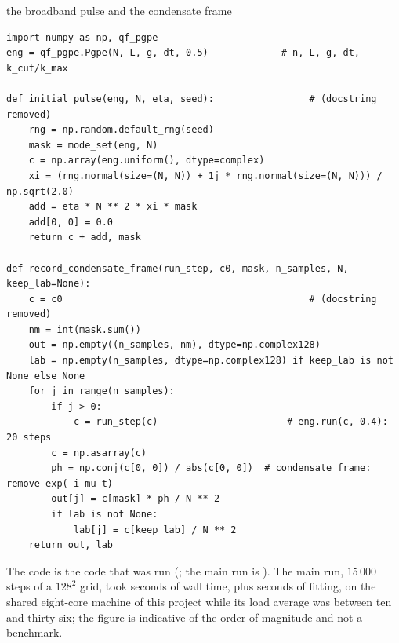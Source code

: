 \begin{rustbox}{the broadband pulse and the condensate frame}
\begin{lstlisting}[style=py,basicstyle=\ttfamily\footnotesize]
import numpy as np, qf_pgpe
eng = qf_pgpe.Pgpe(N, L, g, dt, 0.5)             # n, L, g, dt, k_cut/k_max

def initial_pulse(eng, N, eta, seed):                 # (docstring removed)
    rng = np.random.default_rng(seed)
    mask = mode_set(eng, N)
    c = np.array(eng.uniform(), dtype=complex)
    xi = (rng.normal(size=(N, N)) + 1j * rng.normal(size=(N, N))) / np.sqrt(2.0)
    add = eta * N ** 2 * xi * mask
    add[0, 0] = 0.0
    return c + add, mask

def record_condensate_frame(run_step, c0, mask, n_samples, N, keep_lab=None):
    c = c0                                            # (docstring removed)
    nm = int(mask.sum())
    out = np.empty((n_samples, nm), dtype=np.complex128)
    lab = np.empty(n_samples, dtype=np.complex128) if keep_lab is not None else None
    for j in range(n_samples):
        if j > 0:
            c = run_step(c)                       # eng.run(c, 0.4): 20 steps
        c = np.asarray(c)
        ph = np.conj(c[0, 0]) / abs(c[0, 0])  # condensate frame: remove exp(-i mu t)
        out[j] = c[mask] * ph / N ** 2
        if lab is not None:
            lab[j] = c[keep_lab] / N ** 2
    return out, lab
\end{lstlisting}
\end{rustbox}

The code is the code that was run (; the main run is ).
The main run, $15\,000$ steps of a $128^2$ grid, took  seconds of wall time, plus  seconds of fitting, on the shared eight-core machine of this project while its load average was between ten and thirty-six; the figure is indicative of the order of magnitude and not a benchmark.

